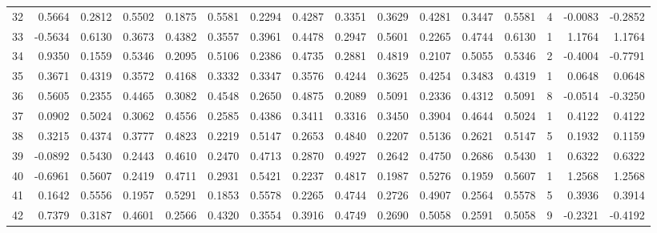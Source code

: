 \begin{tabular}{lrrrrrrrrrrrrrrr}
32  &      0.5664 &  0.2812 &  0.5502 &  0.1875 &  0.5581 &  0.2294 &  0.4287 &  0.3351 &  0.3629 &  0.4281 &   0.3447 &     0.5581 &      4 &                   -0.0083 &                    -0.2852 \\
33  &     -0.5634 &  0.6130 &  0.3673 &  0.4382 &  0.3557 &  0.3961 &  0.4478 &  0.2947 &  0.5601 &  0.2265 &   0.4744 &     0.6130 &      1 &                    1.1764 &                     1.1764 \\
34  &      0.9350 &  0.1559 &  0.5346 &  0.2095 &  0.5106 &  0.2386 &  0.4735 &  0.2881 &  0.4819 &  0.2107 &   0.5055 &     0.5346 &      2 &                   -0.4004 &                    -0.7791 \\
35  &      0.3671 &  0.4319 &  0.3572 &  0.4168 &  0.3332 &  0.3347 &  0.3576 &  0.4244 &  0.3625 &  0.4254 &   0.3483 &     0.4319 &      1 &                    0.0648 &                     0.0648 \\
36  &      0.5605 &  0.2355 &  0.4465 &  0.3082 &  0.4548 &  0.2650 &  0.4875 &  0.2089 &  0.5091 &  0.2336 &   0.4312 &     0.5091 &      8 &                   -0.0514 &                    -0.3250 \\
37  &      0.0902 &  0.5024 &  0.3062 &  0.4556 &  0.2585 &  0.4386 &  0.3411 &  0.3316 &  0.3450 &  0.3904 &   0.4644 &     0.5024 &      1 &                    0.4122 &                     0.4122 \\
38  &      0.3215 &  0.4374 &  0.3777 &  0.4823 &  0.2219 &  0.5147 &  0.2653 &  0.4840 &  0.2207 &  0.5136 &   0.2621 &     0.5147 &      5 &                    0.1932 &                     0.1159 \\
39  &     -0.0892 &  0.5430 &  0.2443 &  0.4610 &  0.2470 &  0.4713 &  0.2870 &  0.4927 &  0.2642 &  0.4750 &   0.2686 &     0.5430 &      1 &                    0.6322 &                     0.6322 \\
40  &     -0.6961 &  0.5607 &  0.2419 &  0.4711 &  0.2931 &  0.5421 &  0.2237 &  0.4817 &  0.1987 &  0.5276 &   0.1959 &     0.5607 &      1 &                    1.2568 &                     1.2568 \\
41  &      0.1642 &  0.5556 &  0.1957 &  0.5291 &  0.1853 &  0.5578 &  0.2265 &  0.4744 &  0.2726 &  0.4907 &   0.2564 &     0.5578 &      5 &                    0.3936 &                     0.3914 \\
42  &      0.7379 &  0.3187 &  0.4601 &  0.2566 &  0.4320 &  0.3554 &  0.3916 &  0.4749 &  0.2690 &  0.5058 &   0.2591 &     0.5058 &      9 &                   -0.2321 &                    -0.4192 \\

\end{tabular}
